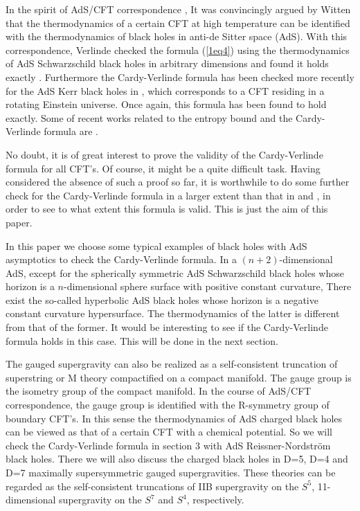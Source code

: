 \documentclass[a4paper,12pt]{article}
\begin{document}
In the spirit of  AdS/CFT correspondence \cite{Mald,Gubs,Witten1},
It was convincingly argued by Witten \cite{Witten2} that the thermodynamics
of a certain CFT at high temperature can be identified with the thermodynamics
of black holes in anti-de Sitter space (AdS). With this correspondence,
Verlinde checked the formula (\ref{1eq4}) using the thermodynamics of 
AdS Schwarzschild black holes in arbitrary dimensions and found it holds
exactly \cite{Verl}.  Furthermore the Cardy-Verlinde formula has been checked
more recently for the AdS Kerr black holes in \cite{Klem}, which corresponds
to a CFT residing in a rotating Einstein universe. Once again, this formula has 
been found to hold exactly. Some of recent works related to the entropy bound
and the Cardy-Verlinde formula are \cite{Kuta,Lin,Noji,Wang,Brus,Savo}. 


No doubt, it is of great interest to prove the validity of the Cardy-Verlinde
formula for all CFT's. Of course, it might be a quite difficult task.  Having 
considered the absence of such a proof so far, it is worthwhile to do some 
further check for the Cardy-Verlinde 
formula in a larger extent than that in \cite{Verl} and \cite{Klem}, in 
order to see to what extent this formula is valid. This is just the aim of 
this paper.  
  

In this paper  we choose some typical examples of black holes with AdS 
asymptotics to check the Cardy-Verlinde 
formula. In a $(n+2)$-dimensional AdS, except for the spherically symmetric 
AdS Schwarzschild black holes whose horizon is a $n$-dimensional sphere 
surface with positive constant curvature, There exist the so-called
hyperbolic AdS black holes whose horizon is a negative constant curvature
hypersurface. The thermodynamics of the latter is different from that of the
former. It would be interesting to see if the Cardy-Verlinde formula holds
in this case. This will be done in the next section. 

The gauged supergravity
can also be  realized as a self-consistent truncation of superstring or M
theory compactified on a compact manifold. The gauge group is the isometry
group of the compact manifold. In the course of AdS/CFT correspondence, the
gauge group is identified with the R-symmetry group of boundary CFT's. In this
sense the thermodynamics of AdS charged black holes can be viewed as that of
a certain CFT with a chemical potential. So we will check the Cardy-Verlinde 
formula in section 3 with AdS Reissner-Nordstr\"om black holes. There we will
also discuss the charged black holes in D=5, D=4 and D=7 maximally 
supersymmetric gauged supergravities. These theories can be regarded as the
self-consistent truncations of IIB supergravity on the $S^5$, 11-dimensional 
supergravity on the $S^7$ and $S^4$, respectively. 
\end{document}
